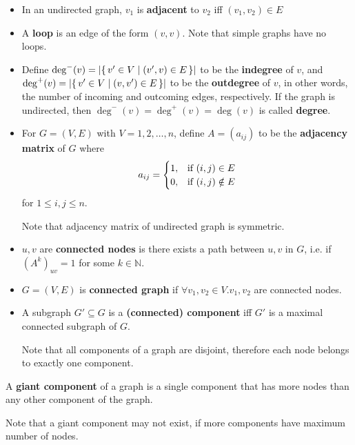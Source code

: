 \begin{definition}
    \begin{itemize}[leftmargin=*]
        \item In an undirected graph, $v_1$ is \textbf{adjacent} to $v_2$ iff $(v_1, v_2) \in E$
        \item A \textbf{loop} is an edge of the form $(v, v)$.
        Note that simple graphs have no loops.
        \item Define $\deg^-(v) = \left| \{\, v' \in V \mid (v', v) \in E \, \} \right|$ to be the \textbf{indegree} of $v$, and $\deg^+(v) = \left| \{\, v' \in V \mid (v, v') \in E \, \} \right|$ to be the \textbf{outdegree} of $v$, in other words, the number of incoming and outcoming edges, respectively.
        If the graph is undirected, then $\deg^-(v) = \deg^+(v) = \deg(v)$ is called \textbf{degree}.
        \item For $G = (V, E)$ with $V = {1, 2, \dots, n}$, define $A = (a_{ij})$ to be the \textbf{adjacency matrix} of $G$ where
        \[ a_{ij} = \begin{cases}
                        1, & \textnormal{if}\ (i, j) \in E \\
                        0, & \textnormal{if}\ (i, j) \notin E
        \end{cases} \]
        for $1 \leq i, j \leq n$.

        Note that adjacency matrix of undirected graph is symmetric.
    \end{itemize}
\end{definition}

\begin{definition}[Connectedness]
    \begin{itemize}[leftmargin=*]
        \item $u, v$ are \textbf{connected nodes} is there exists a path between $u, v$ in $G$, i.e. if $(A^k)_{uv} = 1$ for some $k\in \mathbb{N}$.
        \item $G = (V, E)$ is \textbf{connected graph} if $\forall v_1, v_2 \in V. v_1, v_2$ are connected nodes.
        \item A subgraph $G' \subseteq G$ is a \textbf{(connected) component} iff $G'$ is a maximal connected subgraph of $G$.

        Note that all components of a graph are disjoint, therefore each node belongs to exactly one component.
    \end{itemize}

    \item A \textbf{giant component} of a graph is a single component that has more nodes than any other component of the graph.

    Note that a giant component may not exist, if more components have maximum number of nodes.
\end{definition}

